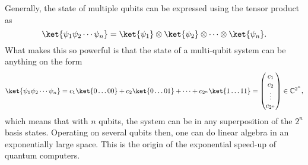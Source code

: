 Generally, the state of multiple qubits can be expressed using the tensor product as
\begin{equation}
    \ket{\psi_1 \psi_2 \cdots  \psi_n} = \ket{\psi_1} \otimes \ket{\psi_2} \otimes \cdots \otimes \ket{\psi_n}
    \label{eq:tensor}.
\end{equation}
What makes this so powerful is that the state of a multi-qubit system can be anything on the form
\begin{equation}
    \ket{\psi_1 \psi_2 \cdots  \psi_n}
    = c_1 \ket{0\dots 00} + c_2 \ket{0\dots 01} + \cdots + c_{2^n} \ket{1\dots 11}
    = \begin{pmatrix}
        c_1 \\ c_2 \\ \vdots \\ c_{2^n}
    \end{pmatrix}
    \in \mathbb{C}^{2^n},
    \label{eq:superposition}
\end{equation}
which means that with $n$ qubits, the system can be in any superposition of the $2^n$ basis states.
Operating on several qubits then, one can do linear algebra in an exponentially large space.
This is the origin of the exponential speed-up of quantum computers.